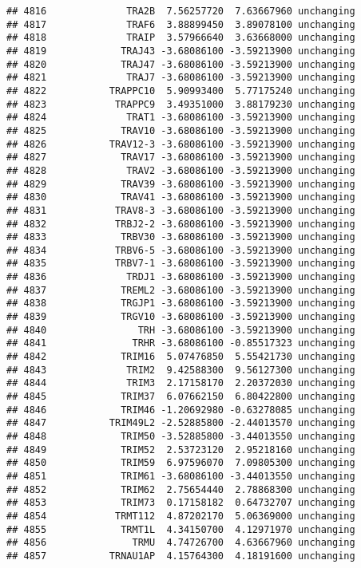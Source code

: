 \documentclass[]{article}
\begin{document}
\begin{verbatim}
## 4816              TRA2B  7.56257720  7.63667960 unchanging
## 4817              TRAF6  3.88899450  3.89078100 unchanging
## 4818              TRAIP  3.57966640  3.63668000 unchanging
## 4819             TRAJ43 -3.68086100 -3.59213900 unchanging
## 4820             TRAJ47 -3.68086100 -3.59213900 unchanging
## 4821              TRAJ7 -3.68086100 -3.59213900 unchanging
## 4822           TRAPPC10  5.90993400  5.77175240 unchanging
## 4823            TRAPPC9  3.49351000  3.88179230 unchanging
## 4824              TRAT1 -3.68086100 -3.59213900 unchanging
## 4825             TRAV10 -3.68086100 -3.59213900 unchanging
## 4826           TRAV12-3 -3.68086100 -3.59213900 unchanging
## 4827             TRAV17 -3.68086100 -3.59213900 unchanging
## 4828              TRAV2 -3.68086100 -3.59213900 unchanging
## 4829             TRAV39 -3.68086100 -3.59213900 unchanging
## 4830             TRAV41 -3.68086100 -3.59213900 unchanging
## 4831            TRAV8-3 -3.68086100 -3.59213900 unchanging
## 4832            TRBJ2-2 -3.68086100 -3.59213900 unchanging
## 4833             TRBV30 -3.68086100 -3.59213900 unchanging
## 4834            TRBV6-5 -3.68086100 -3.59213900 unchanging
## 4835            TRBV7-1 -3.68086100 -3.59213900 unchanging
## 4836              TRDJ1 -3.68086100 -3.59213900 unchanging
## 4837             TREML2 -3.68086100 -3.59213900 unchanging
## 4838             TRGJP1 -3.68086100 -3.59213900 unchanging
## 4839             TRGV10 -3.68086100 -3.59213900 unchanging
## 4840                TRH -3.68086100 -3.59213900 unchanging
## 4841               TRHR -3.68086100 -0.85517323 unchanging
## 4842             TRIM16  5.07476850  5.55421730 unchanging
## 4843              TRIM2  9.42588300  9.56127300 unchanging
## 4844              TRIM3  2.17158170  2.20372030 unchanging
## 4845             TRIM37  6.07662150  6.80422800 unchanging
## 4846             TRIM46 -1.20692980 -0.63278085 unchanging
## 4847           TRIM49L2 -2.52885800 -2.44013570 unchanging
## 4848             TRIM50 -3.52885800 -3.44013550 unchanging
## 4849             TRIM52  2.53723120  2.95218160 unchanging
## 4850             TRIM59  6.97596070  7.09805300 unchanging
## 4851             TRIM61 -3.68086100 -3.44013550 unchanging
## 4852             TRIM62  2.75654440  2.78868300 unchanging
## 4853             TRIM73  0.17158182  0.64732707 unchanging
## 4854            TRMT112  4.87202170  5.06369000 unchanging
## 4855             TRMT1L  4.34150700  4.12971970 unchanging
## 4856               TRMU  4.74726700  4.63667960 unchanging
## 4857           TRNAU1AP  4.15764300  4.18191600 unchanging

\end{verbatim}
\end{document}
